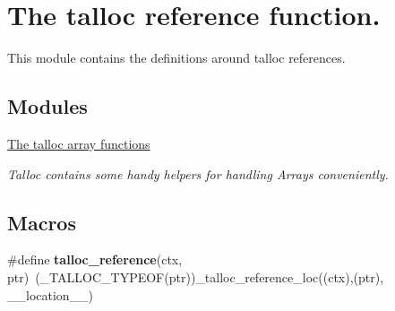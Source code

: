 \hypertarget{group__talloc__ref}{}\section{The talloc reference function.}
\label{group__talloc__ref}


This module contains the definitions around talloc references.  


\subsection*{Modules}
\begin{DoxyCompactItemize}
\item 
\hyperlink{group__talloc__array}{The talloc array functions}
\begin{DoxyCompactList}\small\item\em Talloc contains some handy helpers for handling Arrays conveniently. \end{DoxyCompactList}\end{DoxyCompactItemize}
\subsection*{Macros}
\begin{DoxyCompactItemize}
\item 
\hypertarget{group__talloc__ref_gaa31ec88dc1174f500625c92f3c15f054}{}\#define {\bfseries talloc\+\_\+reference}(ctx,  ptr)~(\+\_\+\+T\+A\+L\+L\+O\+C\+\_\+\+T\+Y\+P\+E\+O\+F(ptr))\+\_\+talloc\+\_\+reference\+\_\+loc((ctx),(ptr), \+\_\+\+\_\+location\+\_\+\+\_\+)\label{group__talloc__ref_gaa31ec88dc1174f500625c92f3c15f054}

\end{DoxyCompactItemize}
